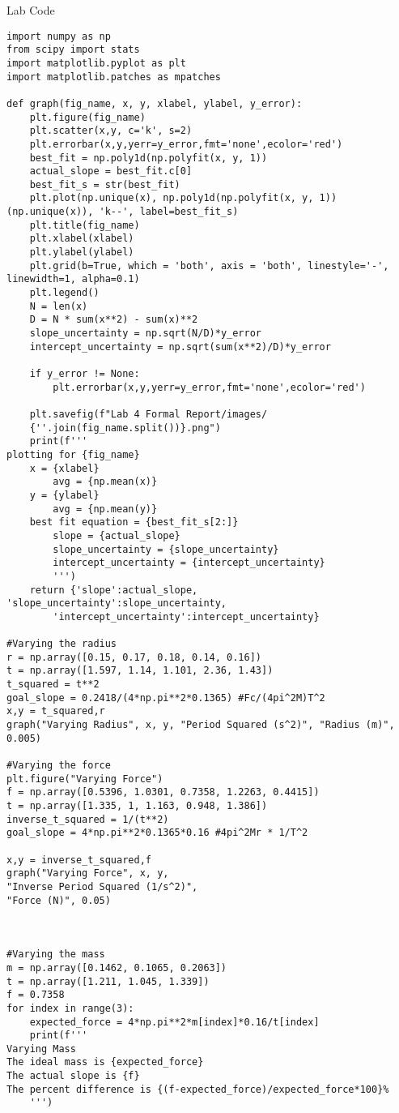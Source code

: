 Lab Code \\
\begin{lstlisting}
import numpy as np
from scipy import stats
import matplotlib.pyplot as plt
import matplotlib.patches as mpatches

def graph(fig_name, x, y, xlabel, ylabel, y_error):
    plt.figure(fig_name)
    plt.scatter(x,y, c='k', s=2)
    plt.errorbar(x,y,yerr=y_error,fmt='none',ecolor='red')
    best_fit = np.poly1d(np.polyfit(x, y, 1))
    actual_slope = best_fit.c[0]
    best_fit_s = str(best_fit)
    plt.plot(np.unique(x), np.poly1d(np.polyfit(x, y, 1))(np.unique(x)), 'k--', label=best_fit_s)
    plt.title(fig_name)
    plt.xlabel(xlabel)
    plt.ylabel(ylabel)
    plt.grid(b=True, which = 'both', axis = 'both', linestyle='-', linewidth=1, alpha=0.1)
    plt.legend()
    N = len(x)
    D = N * sum(x**2) - sum(x)**2
    slope_uncertainty = np.sqrt(N/D)*y_error
    intercept_uncertainty = np.sqrt(sum(x**2)/D)*y_error

    if y_error != None:
        plt.errorbar(x,y,yerr=y_error,fmt='none',ecolor='red')

    plt.savefig(f"Lab 4 Formal Report/images/
    {''.join(fig_name.split())}.png")
    print(f'''
plotting for {fig_name}
    x = {xlabel}
        avg = {np.mean(x)}
    y = {ylabel}
        avg = {np.mean(y)}
    best fit equation = {best_fit_s[2:]}
        slope = {actual_slope}
        slope_uncertainty = {slope_uncertainty}
        intercept_uncertainty = {intercept_uncertainty}
        ''')
    return {'slope':actual_slope, 'slope_uncertainty':slope_uncertainty,
        'intercept_uncertainty':intercept_uncertainty}

#Varying the radius
r = np.array([0.15, 0.17, 0.18, 0.14, 0.16])
t = np.array([1.597, 1.14, 1.101, 2.36, 1.43])
t_squared = t**2
goal_slope = 0.2418/(4*np.pi**2*0.1365) #Fc/(4pi^2M)T^2
x,y = t_squared,r
graph("Varying Radius", x, y, "Period Squared (s^2)", "Radius (m)", 0.005)

#Varying the force
plt.figure("Varying Force")
f = np.array([0.5396, 1.0301, 0.7358, 1.2263, 0.4415])
t = np.array([1.335, 1, 1.163, 0.948, 1.386])
inverse_t_squared = 1/(t**2)
goal_slope = 4*np.pi**2*0.1365*0.16 #4pi^2Mr * 1/T^2

x,y = inverse_t_squared,f
graph("Varying Force", x, y,
"Inverse Period Squared (1/s^2)",
"Force (N)", 0.05)



#Varying the mass
m = np.array([0.1462, 0.1065, 0.2063])
t = np.array([1.211, 1.045, 1.339])
f = 0.7358
for index in range(3):
    expected_force = 4*np.pi**2*m[index]*0.16/t[index]
    print(f'''
Varying Mass
The ideal mass is {expected_force}
The actual slope is {f}
The percent difference is {(f-expected_force)/expected_force*100}%
    ''')
\end{lstlisting}
